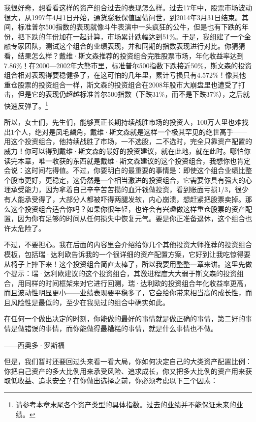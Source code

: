 我很好奇，想看看这样的资产组合过去的表现怎么样。过去17年中，股票市场波动很大，从1997年4月1日开始，通货膨胀保值国债问世，到2014年3月31日结束。其间，标准普尔500指数的表现就像斗牛表演中一头疯狂的公牛，但是也有下跌的年份，把下跌的年份加在一起计算，市场累计跌幅达到51\%。于是，我组建了一个金融专家团队，测试这个组合的业绩表现，并和同期的指数表现进行对比。你猜猜看，结果怎么样？戴维·斯文森推荐的投资组合完胜股票市场，年化收益率达到7.86\%！在2000—2002年大熊市里，标准普尔500指数下跌接近50\%，斯文森的投资组合相对表现得要稳健多了，在这可怕的几年里，累计亏损只有4.572\%！像其他重仓股票的投资组合一样，斯文森的投资组合在2008年股市大崩盘里也遭受了打击，但是它的表现仍超越标准普尔500指数（下跌31\%，而不是下跌37\%），之后就快速反弹了。\footnote{\label{fn:pdf-23-1}请参考本章末尾各个资产类型的具体指数。过去的业绩并不能保证未来的业绩。}

所以，女士们，先生们，能够真正长期持续战胜市场的投资人，100万人里也难找出1个人，绝对是凤毛麟角，戴维·斯文森就是这样一个极其罕见的绝世高手——用这个投资组合，他持续战胜了市场，一不选股，二不选时，完全只靠资产配置的威力！你可以得到戴维·斯文森的最好的投资建议，就在此地，就在此时。哪怕你读完本章，唯一收获的东西就是戴维·斯文森建议的这个投资组合，我想你也肯定会说：这时间花得值。不过，你要明白的最重要的事情是：即使这个组合业绩比整个股市更好，更稳定，这仍然是一个相当激进的投资组合，它需要你具有强大的心理承受能力，因为拿着自己辛辛苦苦攒的血汗钱做投资，看到账面亏损1/3，很少有人能承受得了，大部分人都被吓得两腿发软，内心崩溃，想赶紧把股票卖掉。那么这个投资组合适合你吗？如果你很年轻，也许会有兴趣做这样重仓股票的资产配置，因为你有足够的时间从任何损失中恢复元气。要是你正准备退休，这个组合也许太危险了。

不过，不要担心。我在后面的内容里会介绍给你几个其他投资大师推荐的投资组合模板，包括瑞·达利欧告诉我的一个很详细的资产配置方案，它好到让我吃惊得要从椅子上摔下来！这个投资组合简直太棒了，所以我要用整整一章来讲。这里先做个提示：瑞·达利欧建议的这个投资组合，其激进程度大大弱于斯文森的投资组合，用同样的时间框架来对它进行回测，瑞·达利欧的投资组合年化收益率更高，而且波动性明显更小——业绩表现要平稳多了，它会给你带来相当高的成长性，而且风险性是最低的，至少在我见过的组合中确实如此。

\begin{BookQuote}
在任何一个做出决定的时刻，你能做的最好的事情就是做正确的事情，第二好的事情是做错误的事情，而你能做得最糟糕的事情，就是什么事情也不做。

\hfill ——西奥多·罗斯福
\end{BookQuote}

但是，我们暂时还要回过头来看一看大局，你如何决定自己的大类资产配置比例：你把自己资产的多大比例用来承受风险、追求成长，你又把多大比例的资产用来获取低收益、追求安全？在你做出选择之前，你必须考虑以下三个因素：

